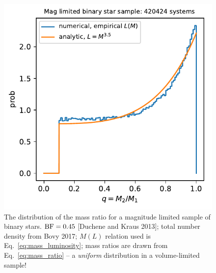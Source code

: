 \documentclass{emulateapj}
\begin{document}
\begin{figure}[!t]
	\begin{center}
		\includegraphics[scale=.8]{figures/q_distribn_mag_limited.pdf}
	\end{center}
	\caption{The distribution of the mass ratio for a magnitude limited 
		sample of binary stars. ${\rm BF} = 0.45$ [Duchene and Kraus 2013]; 
		total 
		number density from Bovy 2017; $M(L)$ relation used is 
		Eq.~\ref{eq:mass_luminosity}; mass ratios are drawn from 
		Eq.~\ref{eq:mass_ratio} -- a \textit{uniform} distribution in a 
		volume-limited sample!}
	\label{fig:q_distribn_mag_limited}
\end{figure}
\end{document}
